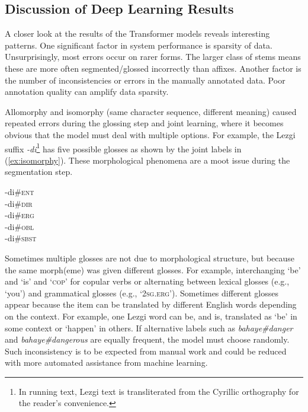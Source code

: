 \subsection{Discussion of Deep Learning Results}
\label{sec:sgDLanalysis}

A closer look at the results of the Transformer models reveals interesting patterns. One significant factor in system performance is sparsity of data. Unsurprisingly, most errors occur on rarer forms. The larger class of stems means these are more often segmented/glossed incorrectly than affixes. Another factor is the number of inconsistencies or errors in the manually annotated data. Poor annotation quality can amplify data sparsity. 

Allomorphy and isomorphy (same character sequence, different meaning) caused repeated errors during the glossing step and joint learning, where it becomes obvious that the model must deal with multiple options. For example, the Lezgi suffix \textit{-di}\footnote{In running text, Lezgi text is transliterated from the Cyrillic orthography for the reader's convenience.} has five possible glosses as shown by the joint labels in (\ref{ex:isomorphy}). These morphological phenomena are a moot issue during the segmentation step. 

\pex   
\label{ex:isomorphy}
-di\#\textsc{ent} \\
-di\#\textsc{dir} \\
-di\#\textsc{erg} \\
-di\#\textsc{obl} \\
-di\#\textsc{sbst} 
\xe

Sometimes multiple glosses are not due to morphological structure, but because the same morph(eme) was given different glosses. For example, interchanging `be' and `is' and `\textsc{cop}' for copular verbs or alternating between lexical glosses (e.g., `you') and grammatical glosses (e.g., `\textsc{2sg.erg}'). Sometimes different glosses appear because the item can be translated by different English words depending on the context. For example, one Lezgi word can be, and is, translated as `be' in some context or `happen' in others. If alternative labels such as \textit{bahaye\#danger} and \textit{bahaye\#dangerous} are equally frequent, the model must choose randomly. Such inconsistency is to be expected from manual work and could be reduced with more automated assistance from machine learning.


